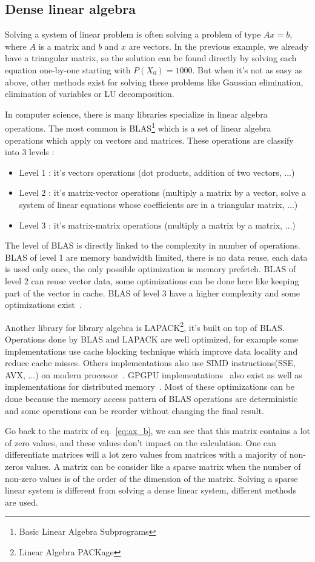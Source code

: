 \subsection{Dense linear algebra}
Solving a system of linear problem is often solving a problem of type $Ax=b$, where $A$ is a matrix and $b$ and $x$ are vectors.
%
In the previous example, we already have a triangular matrix, so the solution can be found directly by solving each equation one-by-one starting with $P(X_0) = 1000$.
%
But when it's not as easy as above, other methods exist for solving these problems like Gaussian elimination, elimination of variables or LU decomposition.


In computer science, there is many libraries specialize in linear algebra operations.
%
The most common is BLAS\footnote{Basic Linear Algebra Subprograms} which is a set of linear algebra operations which apply on vectors and matrices.
%
These operations are classify into 3 levels :
\begin{itemize}
  \item Level 1 : it's vectors operations (dot products, addition of two vectors, ...)
  \item Level 2 : it's matrix-vector operations (multiply a matrix by a vector, solve a system of linear equations whose coefficients are in a triangular matrix, ...)
  \item Level 3 : it's matrix-matrix operations (multiply a matrix by a matrix, ...)
\end{itemize}
%
The level of BLAS is directly linked to the complexity in number of operations.
%
BLAS of level 1 are memory bandwidth limited, there is no data reuse, each data is used only once, the only possible optimization is memory prefetch.
%
BLAS of level 2 can reuse vector data, some optimizations can be done here like keeping part of the vector in cache.
%
BLAS of level 3 have a higher complexity and some optimizations exist~\cite{blas3_opt}.

Another library for library algebra is LAPACK\footnote{Linear Algebra PACKage}, it's built on top of BLAS.
%
Operations done by BLAS and LAPACK are well optimized, for example some implementations use cache blocking technique which improve data locality and reduce cache misses.
%
Others implementations also use SIMD instructions(SSE, AVX, ...) on modern processor~\cite{intel_mkl}.
%
GPGPU implementations~\cite{nvidia_cublas} also exist as well as implementations for distributed memory~\cite{dplasma}.
%
Most of these optimizations can be done because the memory access pattern of BLAS operations are deterministic and some operations can be reorder without changing the final result.


Go back to the matrix of eq.~\eqref{eq:ax_b}, we can see that this matrix contains a lot of zero values, and these values don't impact on the calculation.
%
One can differentiate matrices will a lot zero values from matrices with a majority of non-zeros values.
%
A matrix can be consider like a sparse matrix when the number of non-zero values is of the order of the dimension of the matrix.
%
Solving a sparse linear system is different from solving a dense linear system, different methods are used.
